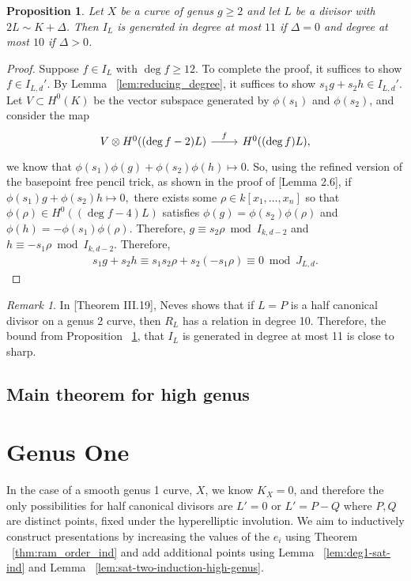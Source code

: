 \documentclass{amsart}
\theoremstyle{plain}
\newtheorem{prop}[thm]{Proposition}
\theoremstyle{definition}
\theoremstyle{remark}
\newtheorem{rem}[thm]{Remark}
\numberwithin{equation}{section}
\newcommand\ssec{\subsection}
\newcommand \halfcan{L}
\begin{document}
\begin{prop}
\label{prop:relations_generation}
Let $X$ be a curve of genus $g \geq 2$ and let $L$ be a divisor with $2L \sim K + \Delta$. Then $I_L$ is generated in degree at most $11$ if $\Delta = 0$ and degree at most $10$ if $\Delta > 0$.
\end{prop}
\begin{proof}
Suppose $f \in I_L$ with $\deg f \geq 12$. To complete the proof, it suffices to show $f \in I_{L,d}'$. By Lemma ~\ref{lem:reducing_degree}, it suffices to show $s_1g+s_2h \in I_{L,d}'$. 
Let $V \subset H^0(K)$ be the vector subspace generated by $\phi(s_1)$ and $\phi(s_2)$, and consider the map
$$\begin{tikzcd}
V \otimes H^0((\deg f - 2)L) \ar {r}{f} & H^0((\deg f)L),
\end{tikzcd}$$
we know that $\phi(s_1)\phi(g) + \phi(s_2) \phi(h) \mapsto 0.$
So, using the refined version of the basepoint free pencil trick, as shown in the proof of \cite{saint-donat:proj}[Lemma 2.6], if $\phi(s_1) g + \phi(s_2)h \mapsto 0,$ there exists some $\rho \in k[x_1, \ldots, x_n]$ so that $\phi(\rho) \in H^0((\deg f - 4)L)$ satisfies $\phi(g) = \phi(s_2)\phi(\rho)$ and $\phi(h) = -\phi(s_1)\phi(\rho).$ Therefore, $g \equiv s_2 \rho \bmod I_{k,d-2}$ and $h \equiv -s_1 \rho \bmod I_{k,d-2}$. Therefore,
\begin{align*}
	s_1g + s_2h \equiv s_1s_2\rho + s_2(-s_1 \rho) \equiv 0 \bmod J_{L,d}.
\end{align*}
\end{proof}

\begin{rem}
\label{rem:relations_generation_ten}
In \cite{neves:halfcan}[Theorem III.19], Neves shows that if $L=P$ is a half canonical divisor on a genus 2 curve, then $R_L$ has a relation in degree 10. Therefore, the bound from Proposition ~\ref{prop:relations_generation}, that $I_L$ is generated in degree at most 11 is close to sharp.
\end{rem}



\ssec{Main theorem for high genus}
\label{ssec:main_g_high}



\section{Genus One}
\label{sec:g_1}

In the case of a smooth genus 1 curve, $X$, we know $K_X = 0$, and therefore the only possibilities for half canonical divisors are $\halfcan' = 0$ or $\halfcan' = P-Q$ where $P,Q$ are distinct points, fixed under the hyperelliptic involution. We aim to inductively construct presentations by increasing the values of the $e_i$ using Theorem ~\ref{thm:ram_order_ind} and add additional points using Lemma ~\ref{lem:deg1-sat-ind} and Lemma ~\ref{lem:sat-two-induction-high-genus}.
\end{document}

